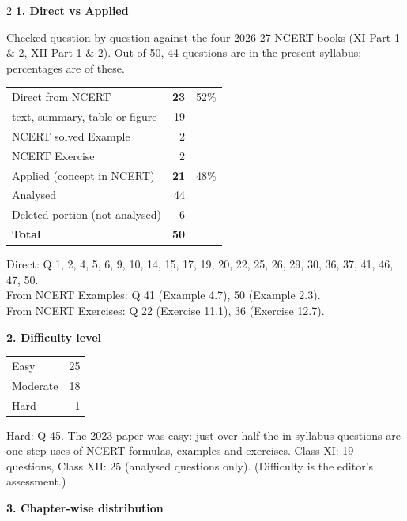 \vspace{4pt}
\begin{multicols}{2}
\textbf{\color{crimson}1. Direct vs Applied}\par\smallskip
{\footnotesize Checked question by question against the four 2026-27 NCERT books (XI Part 1 \& 2, XII Part 1 \& 2). Out of 50, 44 questions are in the present syllabus; percentages are of these.}\par\smallskip
\begin{tabular}{@{}lrr@{}}\toprule
Direct from NCERT & \textbf{23} & 52\%\\
\quad text, summary, table or figure & 19 &\\
\quad NCERT solved Example & 2 &\\
\quad NCERT Exercise & 2 &\\
Applied (concept in NCERT) & \textbf{21} & 48\%\\\midrule
Analysed & 44 &\\
Deleted portion (not analysed) & 6 &\\\midrule
\textbf{Total} & \textbf{50} &\\\bottomrule\end{tabular}\par\smallskip
{\footnotesize Direct: Q 1, 2, 4, 5, 6, 9, 10, 14, 15, 17, 19, 20, 22, 25, 26, 29, 30, 36, 37, 41, 46, 47, 50.\\ From NCERT Examples: Q 41 (Example 4.7), 50 (Example 2.3).\\ From NCERT Exercises: Q 22 (Exercise 11.1), 36 (Exercise 12.7).}\par\medskip
\textbf{\color{crimson}2. Difficulty level}\par\smallskip
\begin{tabular}{@{}lr@{}}\toprule
Easy & 25\\ Moderate & 18\\ Hard & 1\\\bottomrule\end{tabular}\par\smallskip
{\footnotesize Hard: Q 45. The 2023 paper was easy: just over half the in-syllabus questions are one-step uses of NCERT formulas, examples and exercises. Class XI: 19 questions, Class XII: 25 (analysed questions only). (Difficulty is the editor's assessment.)}\par\medskip
\columnbreak
\textbf{\color{crimson}3. Chapter-wise distribution}\par\smallskip
{\footnotesize\begin{tabular}{@{}p{4.7cm}c@{\,}r@{\,}r@{\,}r@{}}\toprule

\end{tabular}}
\end{multicols}
